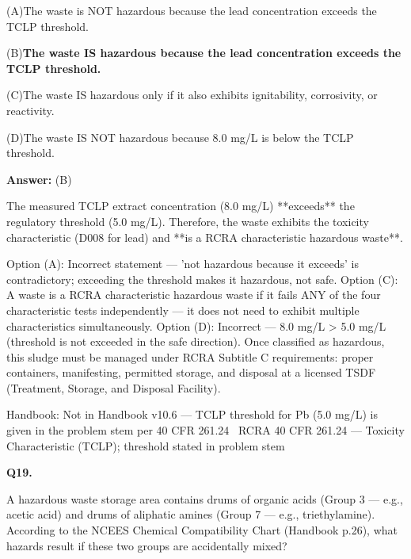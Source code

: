 \documentclass[11pt]{article}
\newcommand{\correct}[1]{\textbf{#1}\;{\color{accent}$\checkmark$}}
\newcommand{\optline}[2]{\par\noindent\hspace{1.2em}(#1)\hspace{0.6em}#2}
\begin{document}
\optline{A}{The waste is NOT hazardous because the lead concentration exceeds the TCLP threshold.}
\optline{B}{\correct{The waste IS hazardous because the lead concentration exceeds the TCLP threshold.}}
\optline{C}{The waste IS hazardous only if it also exhibits ignitability, corrosivity, or reactivity.}
\optline{D}{The waste IS NOT hazardous because 8.0 mg/L is below the TCLP threshold.}
\par\vspace{3pt}
\vspace{2pt}\par\noindent\colorbox{boxbg}{\parbox{\dimexpr\linewidth-2\fboxsep\relax}{%
\vspace{2pt}\textbf{Answer:} (B)\par\vspace{2pt}
{\small The measured TCLP extract concentration (8.0 mg/L) **exceeds** the regulatory threshold (5.0 mg/L). Therefore, the waste exhibits the toxicity characteristic (D008 for lead) and **is a RCRA characteristic hazardous waste**.

Option (A): Incorrect statement --- 'not hazardous because it exceeds' is contradictory; exceeding the threshold makes it hazardous, not safe. Option (C): A waste is a RCRA characteristic hazardous waste if it fails ANY of the four characteristic tests independently --- it does not need to exhibit multiple characteristics simultaneously. Option (D): Incorrect --- 8.0 mg/L > 5.0 mg/L (threshold is not exceeded in the safe direction). Once classified as hazardous, this sludge must be managed under RCRA Subtitle C requirements: proper containers, manifesting, permitted storage, and disposal at a licensed TSDF (Treatment, Storage, and Disposal Facility).}\par\vspace{2pt}
{\footnotesize\color{soft}Handbook: Not in Handbook v10.6 --- TCLP threshold for Pb (5.0 mg/L) is given in the problem stem per 40 CFR 261.24 \textbullet\ RCRA 40 CFR 261.24 --- Toxicity Characteristic (TCLP); threshold stated in problem stem}\vspace{2pt}
}}
\vspace{9pt}
\filbreak
\textbf{\color{accent}Q19.}\par\vspace{2pt}
A hazardous waste storage area contains drums of organic acids (Group 3 --- e.g., acetic acid) and drums of aliphatic amines (Group 7 --- e.g., triethylamine). According to the NCEES Chemical Compatibility Chart (Handbook p.26), what hazards result if these two groups are accidentally mixed?
\end{document}
